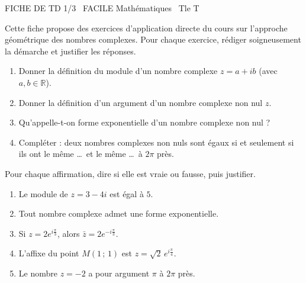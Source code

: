 \documentclass[11pt]{article}
\begin{document}
\begin{tcolorbox}[enhanced,colback=popink,colframe=popink,arc=10pt,boxrule=0pt,left=12pt,right=12pt,top=9pt,bottom=9pt]
{\color{white}\popxbold\small FICHE DE TD 1/3 \textbullet\ FACILE \hfill Mathématiques \textbullet\ Tle T\par}
\end{tcolorbox}
\vspace{4pt}
Cette fiche propose des exercices d'application directe du cours sur l'approche géométrique des nombres complexes. Pour chaque exercice, rédiger soigneusement la démarche et justifier les réponses.

\begin{exercice}
\begin{enumerate}
\item Donner la définition du module d'un nombre complexe $z = a + ib$ (avec $a, b \in \mathbb{R}$).
\item Donner la définition d'un argument d'un nombre complexe non nul $z$.
\item Qu'appelle-t-on forme exponentielle d'un nombre complexe non nul ?
\item Compléter : deux nombres complexes non nuls sont égaux si et seulement si ils ont le même \ldots\ et le même \ldots\ à $2\pi$ près.
\end{enumerate}
\end{exercice}

\begin{exercice}
Pour chaque affirmation, dire si elle est vraie ou fausse, puis justifier.
\begin{enumerate}
\item Le module de $z = 3 - 4i$ est égal à $5$.
\item Tout nombre complexe admet une forme exponentielle.
\item Si $z = 2e^{i\frac{\pi}{3}}$, alors $\bar{z} = 2e^{-i\frac{\pi}{3}}$.
\item L'affixe du point $M(1\,;\,1)$ est $z = \sqrt{2}\,e^{i\frac{\pi}{4}}$.
\item Le nombre $z = -2$ a pour argument $\pi$ à $2\pi$ près.
\end{enumerate}
\end{exercice}
\end{document}
